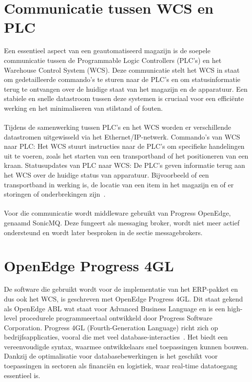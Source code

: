 \section{Communicatie tussen WCS en PLC}
Een essentieel aspect van een geautomatiseerd magazijn is de soepele communicatie tussen de Programmable Logic Controllers (PLC’s) en 
het Warehouse Control System (WCS). 
Deze communicatie stelt het WCS in staat om gedetailleerde commando’s te sturen naar de PLC’s en om statusinformatie terug te ontvangen over de huidige staat van het magazijn en de apparatuur. 
Een stabiele en snelle datastroom tussen deze systemen is cruciaal voor een efficiënte werking en het minimaliseren van stilstand of fouten.
\\\\
Tijdens de samenwerking tussen PLC’s en het WCS worden er verschillende datastromen uitgewisseld via het Ethernet/IP-netwerk.
Commando’s van WCS naar PLC: Het WCS stuurt instructies naar de PLC’s om specifieke handelingen uit te voeren, zoals het starten van een transportband of het positioneren van een kraan.
Statusupdates van PLC naar WCS: De PLC’s geven informatie terug aan het WCS over de huidige status van apparatuur. Bijvoorbeeld of een transportband in werking is, 
de locatie van een item in het magazijn en of er storingen of onderbrekingen zijn~\autocite{Laar2013}.
\\\\
Voor die communicatie wordt middleware gebruikt van Progress OpenEdge, genaamd SonicMQ. 
Deze fungeert als messaging broker, wordt niet meer actief ondersteund en wordt later besproken in de sectie messagebrokers.

\section{OpenEdge Progress 4GL} 
De software die gebruikt wordt voor de implementatie van het ERP-pakket en dus ook het WCS, is geschreven met OpenEdge Progress 4GL.
Dit staat gekend als OpenEdge ABL wat staat voor Advanced Business Language en is een high-level procedurele programmeertaal ontwikkeld door Progress Software Corporation.
Progress 4GL (Fourth-Generation Language) richt zich op bedrijfsapplicaties, vooral die met veel database-interacties~\autocite{OpenEdge2017}.
Het biedt een vereenvoudigde syntax, waarmee ontwikkelaars snel toepassingen kunnen bouwen.
Dankzij de optimalisatie voor databasebewerkingen is het geschikt voor toepassingen in sectoren als financiën en logistiek, 
waar real-time datatoegang essentieel is.
 
